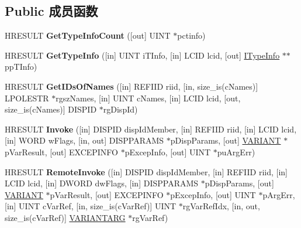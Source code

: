 \subsection*{Public 成员函数}
\begin{DoxyCompactItemize}
\item 
\mbox{\label{interface_i_dispatch_a72fe9f35cab873de3fd5d4d3389d4910}} 
H\+R\+E\+S\+U\+LT {\bfseries Get\+Type\+Info\+Count} (\mbox{[}out\mbox{]} U\+I\+NT $\ast$pctinfo)
\item 
\mbox{\label{interface_i_dispatch_a782bd8c70bd4796ec222122062846e15}} 
H\+R\+E\+S\+U\+LT {\bfseries Get\+Type\+Info} (\mbox{[}in\mbox{]} U\+I\+NT i\+T\+Info, \mbox{[}in\mbox{]} L\+C\+ID lcid, \mbox{[}out\mbox{]} \hyperlink{interface_i_type_info}{I\+Type\+Info} $\ast$$\ast$pp\+T\+Info)
\item 
\mbox{\label{interface_i_dispatch_ac35e24a6bd4b4ab001beaf275c24b84e}} 
H\+R\+E\+S\+U\+LT {\bfseries Get\+I\+Ds\+Of\+Names} (\mbox{[}in\mbox{]} R\+E\+F\+I\+ID riid, \mbox{[}in, size\+\_\+is(c\+Names)\mbox{]} L\+P\+O\+L\+E\+S\+TR $\ast$rgsz\+Names, \mbox{[}in\mbox{]} U\+I\+NT c\+Names, \mbox{[}in\mbox{]} L\+C\+ID lcid, \mbox{[}out, size\+\_\+is(c\+Names)\mbox{]} D\+I\+S\+P\+ID $\ast$rg\+Disp\+Id)
\item 
\mbox{\label{interface_i_dispatch_a9d17e9611eb07348e5b908bdeffebc95}} 
H\+R\+E\+S\+U\+LT {\bfseries Invoke} (\mbox{[}in\mbox{]} D\+I\+S\+P\+ID disp\+Id\+Member, \mbox{[}in\mbox{]} R\+E\+F\+I\+ID riid, \mbox{[}in\mbox{]} L\+C\+ID lcid, \mbox{[}in\mbox{]} W\+O\+RD w\+Flags, \mbox{[}in, out\mbox{]} D\+I\+S\+P\+P\+A\+R\+A\+MS $\ast$p\+Disp\+Params, \mbox{[}out\mbox{]} \hyperlink{structtag_v_a_r_i_a_n_t}{V\+A\+R\+I\+A\+NT} $\ast$p\+Var\+Result, \mbox{[}out\mbox{]} E\+X\+C\+E\+P\+I\+N\+FO $\ast$p\+Excep\+Info, \mbox{[}out\mbox{]} U\+I\+NT $\ast$pu\+Arg\+Err)
\item 
\mbox{\label{interface_i_dispatch_a3741b5916b5b50f9ed376273cd77f89d}} 
H\+R\+E\+S\+U\+LT {\bfseries Remote\+Invoke} (\mbox{[}in\mbox{]} D\+I\+S\+P\+ID disp\+Id\+Member, \mbox{[}in\mbox{]} R\+E\+F\+I\+ID riid, \mbox{[}in\mbox{]} L\+C\+ID lcid, \mbox{[}in\mbox{]} D\+W\+O\+RD dw\+Flags, \mbox{[}in\mbox{]} D\+I\+S\+P\+P\+A\+R\+A\+MS $\ast$p\+Disp\+Params, \mbox{[}out\mbox{]} \hyperlink{structtag_v_a_r_i_a_n_t}{V\+A\+R\+I\+A\+NT} $\ast$p\+Var\+Result, \mbox{[}out\mbox{]} E\+X\+C\+E\+P\+I\+N\+FO $\ast$p\+Excep\+Info, \mbox{[}out\mbox{]} U\+I\+NT $\ast$p\+Arg\+Err, \mbox{[}in\mbox{]} U\+I\+NT c\+Var\+Ref, \mbox{[}in, size\+\_\+is(c\+Var\+Ref)\mbox{]} U\+I\+NT $\ast$rg\+Var\+Ref\+Idx, \mbox{[}in, out, size\+\_\+is(c\+Var\+Ref)\mbox{]} \hyperlink{structtag_v_a_r_i_a_n_t}{V\+A\+R\+I\+A\+N\+T\+A\+RG} $\ast$rg\+Var\+Ref)
\end{DoxyCompactItemize}
